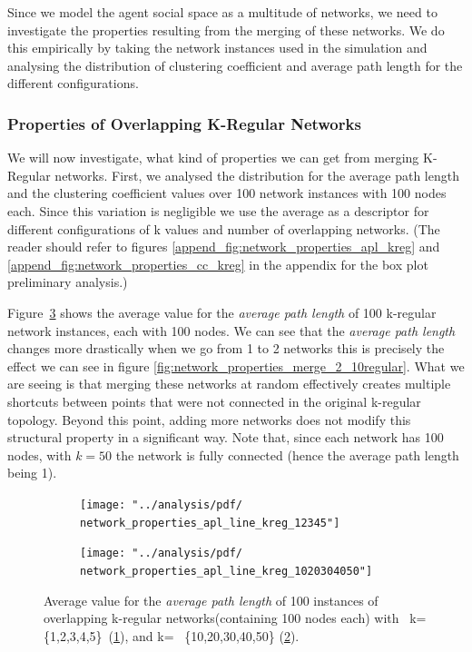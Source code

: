 \documentclass[preprint,number]{elsarticle}
\begin{document}
Since we model the agent social space as a multitude of networks, we need to investigate the properties resulting from the merging of these networks. We do this empirically by taking the network instances used in the simulation and analysing the distribution of clustering coefficient and average path length for the different configurations.

\subsubsection{Properties of Overlapping K-Regular Networks}
\label{sec:overlapping_kreg}
We will now investigate, what kind of properties we can get from merging K-Regular networks. First, we analysed the distribution for the average path length and the clustering coefficient values over 100 network instances with 100 nodes each. Since this variation is negligible we use the average as a descriptor for different configurations of k values and number of overlapping networks. (The reader should refer to figures \ref{append_fig:network_properties_apl_kreg} and \ref{append_fig:network_properties_cc_kreg} in the appendix for the box plot preliminary analysis.)  

Figure~\ref{fig:network_properties_apl_line_kreg} shows the average value for the \textit{average path length} of 100 k-regular network instances, each with 100 nodes. We can see that the \textit{average path length} changes more drastically when we go from 1 to 2 networks this is precisely the effect we can see in figure \ref{fig:network_properties_merge_2_10regular}. What we are seeing is that merging these networks at random effectively creates multiple shortcuts between points that were not connected in the original k-regular topology. Beyond this point, adding more networks does not modify this structural property in a significant way. Note that, since each network has 100 nodes, with $k=50$ the network is fully connected (hence the average path length being 1). 

\begin{figure}[H]
	\centering
	\begin{subfigure}{.5\linewidth}
		\centering
		\texttt{[image: "../analysis/pdf/ network\_properties\_apl\_line\_kreg\_12345"]}
		\caption{}
		\label{fig:network_properties_apl_line_kreg_12345}
	\end{subfigure}%
	\begin{subfigure}{.5\linewidth}
		\centering
		\texttt{[image: "../analysis/pdf/ network\_properties\_apl\_line\_kreg\_1020304050"]}
		\caption{}
		\label{fig:network_properties_apl_line_kreg_1020304050}
	\end{subfigure}
	\begin{minipage}{0.9\textwidth}
		\vspace{0.2cm}
		\caption{Average value for the \textit{average path length} of 100 instances of overlapping k-regular networks(containing 100 nodes each) with ~k=\{1,2,3,4,5\}~(\ref{fig:network_properties_apl_line_kreg_12345}), and k= ~\{10,20,30,40,50\} (\ref{fig:network_properties_apl_line_kreg_1020304050}).}
		\label{fig:network_properties_apl_line_kreg}
	\end{minipage}
\end{figure}
\end{document}
